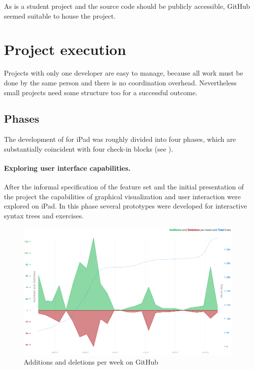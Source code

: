 As \Nyaya is a student project and the source code should be publicly accessible,
GitHub seemed suitable to house the project.

\section{Project execution}

Projects with only one developer are easy to manage, 
because all work must be done by the same person
and there is no coordination overhead.
Nevertheless small projects need some structure too for a successful outcome.

\subsection{Phases}

The development of \Nyaya for iPad was roughly divided into four phases,
which are substantially coincident with four check-in blocks (see ).

\paragraph{Exploring user interface capabilities.}

After the informal specification of the feature set and the initial presentation of the project
the capabilities of graphical visualization and  user interaction were explored on iPad.
In this phase several prototypes were developed for interactive syntax trees and exercises.

\begin{figure}[htbp]
\begin{center}
\includegraphics[scale=0.41]{pics/work.png}
\caption{Additions and deletions per week on GitHub}
\label{fig:GitHubGraphAddDel}
\end{center}
\end{figure}

